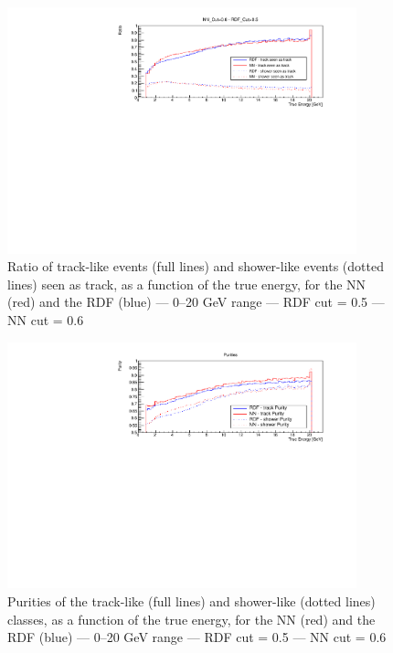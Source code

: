 \begin{figure}[!h]
    \centering
    \includegraphics[width=0.9\textwidth]{fig/PID_Efficiency_RDF_CUT_0_5_VS_NN_CUT_0_6_E_cut_20.pdf}
    \caption{Ratio of track-like events (full lines) and shower-like events (dotted lines) seen as track, as a function of the true energy, for the NN (red) and the RDF (blue)  --- 0--20 GeV range --- RDF cut = 0.5 --- NN cut = 0.6}
    \label{fig:EUFBKBF}
\end{figure}

\begin{figure}[!h]
    \centering
    \includegraphics[width=0.9\textwidth]{fig/PID_Purity_RDF_CUT_0_5_VS_NN_CUT_0_6_E_cut_20.pdf}
    \caption{Purities of the track-like (full lines) and shower-like (dotted lines) classes, as a function of the true energy, for the NN (red) and the RDF (blue)  --- 0--20 GeV range --- RDF cut = 0.5 --- NN cut = 0.6}
    \label{fig:SLKNPE}
\end{figure}

